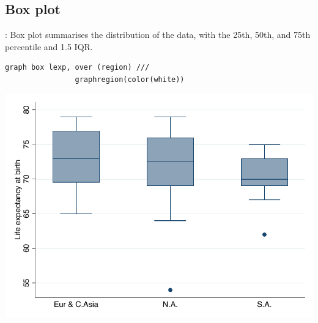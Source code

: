 \subsection{Box plot}
\begin{frame}[fragile]{\secname: \subsecname}
Box plot summarises the distribution of the data, with the 25th, 50th,
and 75th percentile and 1.5 IQR.
\begin{verbatim}
graph box lexp, over (region) ///
                graphregion(color(white))\end{verbatim}

\begin{center}
	\includegraphics[scale=0.5]{images/box}
\end{center}
\end{frame}

